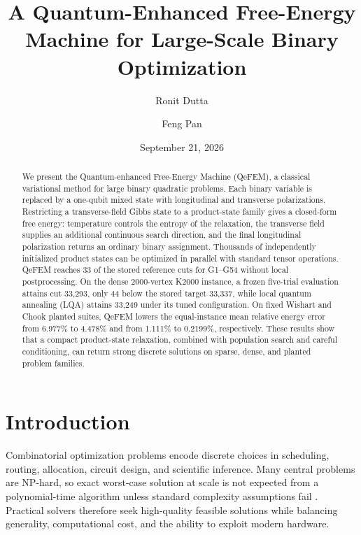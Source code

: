 \documentclass[
  aps,
  prx,
  reprint,
  amsmath,
  amssymb,
  groupedaddress,
  nofootinbib,
  floatfix,
  longbibliography
]{revtex4-2}
\newcommand{\qefem}{QeFEM}
\newcommand{\lqa}{\textsc{LQA}}
\begin{document}
\title{A Quantum-Enhanced Free-Energy Machine for Large-Scale Binary Optimization}
\author{Ronit Dutta}
\author{Feng Pan}
\date{September 21, 2026}

\begin{abstract}
We present the Quantum-enhanced Free-Energy Machine (\qefem), a classical
variational method for large binary quadratic problems.  Each binary variable
is replaced by a one-qubit mixed state with longitudinal and transverse
polarizations.  Restricting a transverse-field Gibbs state to a product-state
family gives a closed-form free energy: temperature controls the entropy of
the relaxation, the transverse field supplies an additional continuous search
direction, and the final longitudinal polarization returns an ordinary binary
assignment.  Thousands of independently initialized product states can be
optimized in parallel with standard tensor operations.  \qefem{} reaches 33
of the stored reference cuts for G1--G54 without local postprocessing.  On the
dense 2000-vertex K2000 instance, a frozen five-trial evaluation attains cut
33,293, only 44 below the stored target 33,337, while local quantum annealing
(\lqa) attains 33,249 under its tuned configuration.  On fixed Wishart and
Chook planted suites, \qefem{} lowers the equal-instance mean relative energy
error from 6.977\% to 4.478\% and from 1.111\% to 0.2199\%, respectively.
These results show that a compact product-state relaxation, combined with
population search and careful conditioning, can return strong discrete
solutions on sparse, dense, and planted problem families.
\end{abstract}

\maketitle

\section{Introduction}
\label{sec:introduction}

Combinatorial optimization problems encode discrete choices in scheduling,
routing, allocation, circuit design, and scientific inference.  Many central
problems are NP-hard, so exact worst-case solution at scale is not expected
from a polynomial-time algorithm unless standard complexity assumptions fail
\cite{karp1972,barahona1982}.  Practical solvers therefore seek high-quality
feasible solutions while balancing generality, computational cost, and the
ability to exploit modern hardware.
\end{document}
